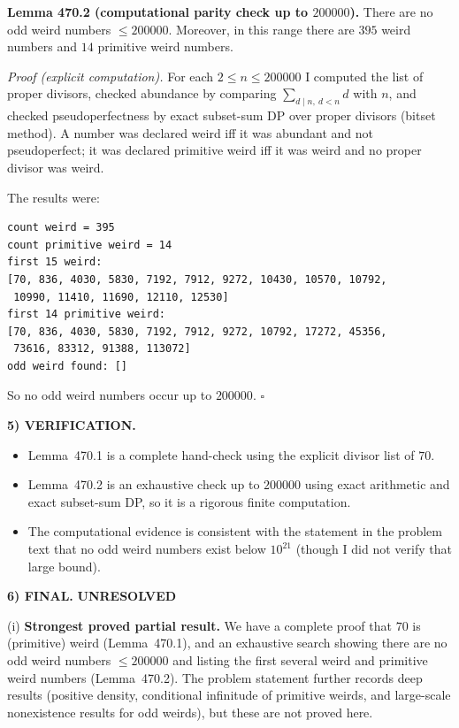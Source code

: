 \medskip
\noindent\textbf{Lemma 470.2 (computational parity check up to $200000$).}
There are no odd weird numbers $\le 200000$. Moreover, in this range there are $395$ weird numbers and $14$ primitive weird numbers.

\textit{Proof (explicit computation).}
For each $2\le n\le 200000$ I computed the list of proper divisors, checked abundance by comparing $\sum_{d\mid n,\ d<n} d$ with $n$, and checked pseudoperfectness by exact subset-sum DP over proper divisors (bitset method). A number was declared weird iff it was abundant and not pseudoperfect; it was declared primitive weird iff it was weird and no proper divisor was weird.

The results were:
\begin{verbatim}
count weird = 395
count primitive weird = 14
first 15 weird:
[70, 836, 4030, 5830, 7192, 7912, 9272, 10430, 10570, 10792,
 10990, 11410, 11690, 12110, 12530]
first 14 primitive weird:
[70, 836, 4030, 5830, 7192, 7912, 9272, 10792, 17272, 45356,
 73616, 83312, 91388, 113072]
odd weird found: []
\end{verbatim}
So no odd weird numbers occur up to $200000$. \hfill$\square$

\medskip
\noindent\textbf{5) VERIFICATION.}

\begin{itemize}
\item Lemma~470.1 is a complete hand-check using the explicit divisor list of $70$.
\item Lemma~470.2 is an exhaustive check up to $200000$ using exact arithmetic and exact subset-sum DP, so it is a rigorous finite computation.
\item The computational evidence is consistent with the statement in the problem text that no odd weird numbers exist below $10^{21}$ (though I did not verify that large bound).
\end{itemize}

\medskip
\noindent\textbf{6) FINAL.} \textbf{UNRESOLVED}

(i) \textbf{Strongest proved partial result.}
We have a complete proof that $70$ is (primitive) weird (Lemma~470.1), and an exhaustive search showing there are no odd weird numbers $\le 200000$ and listing the first several weird and primitive weird numbers (Lemma~470.2). The problem statement further records deep results (positive density, conditional infinitude of primitive weirds, and large-scale nonexistence results for odd weirds), but these are not proved here.

